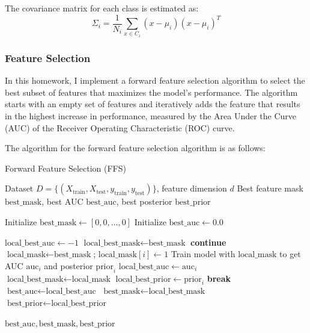 \documentclass[12pt,a4paper]{article}
\begin{document}
The covariance matrix for each class is estimated as:
\begin{equation}
\Sigma_i = \frac{1}{N_i} \sum_{x \in C_i} (x - \mu_i)(x - \mu_i)^T
\end{equation}

\subsubsection{Feature Selection}
In this homework, I implement a forward feature selection algorithm to select the best subset of features that maximizes the model's performance. The algorithm starts with an empty set of features and iteratively adds the feature that results in the highest increase in performance, measured by the Area Under the Curve (AUC) of the Receiver Operating Characteristic (ROC) curve.

The algorithm for the forward feature selection algorithm is as follows:
\begin{algorithm}[H]
\caption{Forward Feature Selection (FFS)}
\label{alg:ffs}
\begin{algorithmic}[1]
\Require Dataset $D = \{(X_{\text{train}}, X_{\text{test}}, y_{\text{train}}, y_{\text{test}})\}$, feature dimension $d$
\Ensure Best feature mask $\text{best\_mask}$, best AUC $\text{best\_auc}$, best posterior $\text{best\_prior}$

\State Initialize $\text{best\_mask} \gets [0, 0, \dots, 0]$ 
\State Initialize $\text{best\_auc} \gets 0.0$

\Repeat
    \State $\text{local\_best\_auc} \gets -1$
    \State $\text{local\_best\_mask} \gets \text{best\_mask}$
            \State \textbf{continue}
        \EndIf
        \State $\text{local\_mask} \gets \text{best\_mask}$; $\text{local\_mask}[i] \gets 1$
        \State Train model with $\text{local\_mask}$ to get AUC $\text{auc}_i$ and posterior $\text{prior}_i$
            \State $\text{local\_best\_auc} \gets \text{auc}_i$
            \State $\text{local\_best\_mask} \gets \text{local\_mask}$
            \State $\text{local\_best\_prior} \gets \text{prior}_i$
        \EndIf
    \EndFor
        \State \textbf{break}
    \Else
        \State $\text{best\_auc} \gets \text{local\_best\_auc}$
        \State $\text{best\_mask} \gets \text{local\_best\_mask}$
        \State $\text{best\_prior} \gets \text{local\_best\_prior}$
    \EndIf
{}

\State \Return $\text{best\_auc}, \text{best\_mask}, \text{best\_prior}$
\end{algorithmic}
\end{algorithm}
\end{document}
